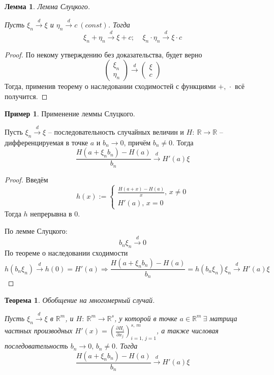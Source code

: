 \documentclass[a4paper,12pt]{article}
\theoremstyle{plain}
\newtheorem{theorem}{Теорема}[section]
\newtheorem{lemma}{Лемма}[section]
\theoremstyle{definition}
\newtheorem*{example}{Пример}
\theoremstyle{remark}
\begin{document}
\begin{lemma}
  Лемма Слуцкого.

  Пусть $\xi_n \overset{d}{\to} \xi$ и $\eta_n \overset{d}{\to} c \:(const)$. Тогда 
  \[
    \xi_n + \eta_n \overset{d}{\to} \xi + c ;\;\;\;\; \xi_n\cdot\eta_n \overset{d}{\to} \xi\cdot c
  \]
\end{lemma}

\begin{proof}
  По некому утверждению без доказательства, будет верно
  \[
    \begin{pmatrix}
      \xi_n\\
      \eta_n
    \end{pmatrix} \overset{d}{\to} \begin{pmatrix}
      \xi\\
      c
    \end{pmatrix}
  \]
  Тогда, применив теорему о наследовании сходимостей с функциями $+,\, \cdot$ всё получится.
\end{proof}

\begin{example}
  Применение леммы Слуцкого.

  Пусть $\xi_n \overset{d}{\to} \xi$ -- последовательность случайных величин и $H :\: \mathbb{R} \to \mathbb{R}$ -- дифференцируемая в точке $a$ и $b_n \to 0$, причём $b_n \neq 0$. Тогда
  \[
    \frac{H(a + \xi_nb_n) - H(a)}{b_n} \overset{d}{\to} H'(a)\xi
  \]
\end{example}

\begin{proof}
  Введём
  \[
    h(x) := \begin{cases}
      \frac{H(a + x) - H(a)}{x},\, x \neq 0\\
      H'(a),\, x = 0
    \end{cases}
  \]
  Тогда $h$ непрерывна в $0$.

  По лемме Слуцкого:
  \[
    b_n\xi_n \overset{d}{\to} 0
  \]
  По теореме о наследовании сходимости
  \[
    h(b_n\xi_n) \overset{d}{\to} h(0) = H'(a) \Rightarrow \frac{H(a + \xi_nb_n) - H(a)}{b_n} = h(b_n\xi_n)\xi_n \overset{d}{\to} H'(a)\xi
  \]
\end{proof}

\begin{theorem}
  Обобщение на многомерный случай.

  Пусть $\xi_n \overset{d}{\to} \xi$ в $\mathbb{R}^m$, и $H :\: \mathbb{R}^m \to \mathbb{R}^s$, у которой в точке $a \in \mathbb{R}^m \: \exists$ матрица частных производных $H'(x) = \left(\frac{\partial H_i}{\partial x_j}\right)_{i = 1,\,j = 1}^{s,\, m}$, а также числовая последовательность
  $b_n \to 0,\, b_n \neq 0$. Тогда
  \[
    \frac{H(a + \xi_nb_n) - H(a)}{b_n} \overset{d}{\to} H'(a)\xi
  \]
\end{theorem}
\end{document}
